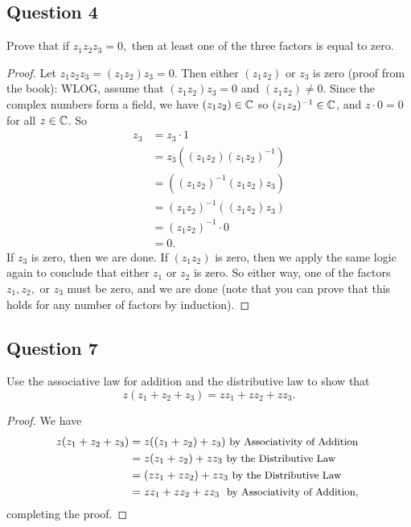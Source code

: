 \subsection{Question 4}
\begin{prob}
    Prove that if $z_1z_2z_3=0,$ then at least one of the three factors is equal to zero.
\end{prob}
\begin{proof}
    Let $z_1z_2z_3=(z_1z_2)z_3=0.$ Then either $(z_1z_2)$ or $z_3$ is zero (proof from the book): WLOG, assume that  $(z_1z_2)z_3=0$ and $(z_1z_2) \neq 0$. Since the complex numbers form a field, we have $(z_1z_2) \in \mathbb{C}$ so $(z_1z_2)^{-1} \in \mathbb{C}$, and $z\cdot0 =0$ for all $z \in \mathbb{C}$. So
        \begin{align*}
            z_3&=z_3\cdot1\\
               &=z_3\left( (z_1z_2)(z_1z_2)^{-1} \right) \\
               &= \left( (z_1z_2)^{-1}(z_1z_2)z_3 \right) \\
               &= (z_1z_2)^{-1}\left( (z_1z_2)z_3 \right) \\
               &= (z_1z_2)^{-1}\cdot0\\
               &=0.
        \end{align*}
        If $z_3$ is zero, then we are done. If $(z_1z_2)$ is zero, then we apply the same logic again to conclude that either $z_1$ or $z_2$ is zero. So either way, one of the factors $z_1,z_2,$ or $z_3$ must be zero, and we are done (note that you can prove that this holds for any number of factors by induction).
\end{proof}

\subsection{Question 7}
\begin{prob}
    Use the associative law for addition and the distributive law to show that 
    \[
        z(z_1+z_2+z_3)=zz_1+zz_2+zz_3.
    \]
\end{prob}
\begin{proof}
    We have
    \begin{align*}
        z(z_1+z_2+z_3)&=z((z_1+z_2)+z_3) \ \small{\text{by Associativity of Addition}} \\
                &=z(z_1+z_2)+zz_3 \ \small{\text{by the Distributive Law}} \\
                &=(zz_1+zz_2)+zz_3 \ \small{\text{by the Distributive Law}} \\
                &=zz_1+zz_2+zz_3 \ \small{\text{ by Associativity of Addition, }} \\
    \end{align*}
    completing the proof.
\end{proof}

